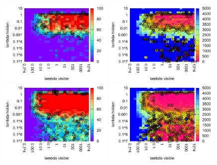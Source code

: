 \begin{figure}[H]
  \centering
  \includegraphics[width=0.49\textwidth]{img/k3/tlr-3-success.pdf} 
  \includegraphics[width=0.49\textwidth]{img/k3/tlr-3-epoch.pdf}   
  \includegraphics[width=0.49\textwidth]{img/k3/tlr-5-success.pdf}   
  \includegraphics[width=0.49\textwidth]{img/k3/tlr-5-epoch.pdf}  

\end{figure}
